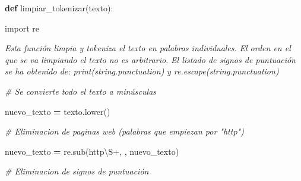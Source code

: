 \documentclass[
  11pt,
  a4paper,
]{article}
\newenvironment{Shaded}{\begin{snugshade}}{\end{snugshade}}
\newcommand{\CommentTok}[1]{\textcolor[rgb]{0.56,0.35,0.01}{\textit{#1}}}
\newcommand{\ImportTok}[1]{#1}
\newcommand{\KeywordTok}[1]{\textcolor[rgb]{0.13,0.29,0.53}{\textbf{#1}}}
\newcommand{\NormalTok}[1]{#1}
\newcommand{\OperatorTok}[1]{\textcolor[rgb]{0.81,0.36,0.00}{\textbf{#1}}}
\newcommand{\StringTok}[1]{\textcolor[rgb]{0.31,0.60,0.02}{#1}}
\begin{document}
\begin{Shaded}
\begin{Highlighting}[]
\KeywordTok{def}\NormalTok{ limpiar\_tokenizar(texto):}

    \ImportTok{import}\NormalTok{ re}
    
    \CommentTok{\textquotesingle{}\textquotesingle{}\textquotesingle{}}
\CommentTok{    Esta función limpia y tokeniza el texto en palabras individuales.}
\CommentTok{    El orden en el que se va limpiando el texto no es arbitrario.}
\CommentTok{    El listado de signos de puntuación se ha obtenido de: print(string.punctuation)}
\CommentTok{    y re.escape(string.punctuation)}
\CommentTok{    \textquotesingle{}\textquotesingle{}\textquotesingle{}}
    
    \CommentTok{\# Se convierte todo el texto a minúsculas}

\NormalTok{    nuevo\_texto }\OperatorTok{=}\NormalTok{ texto.lower()}
    
    \CommentTok{\# Eliminacion de paginas web (palabras que empiezan por "http")}
    
\NormalTok{    nuevo\_texto }\OperatorTok{=}\NormalTok{ re.sub(}\StringTok{\textquotesingle{}http\textbackslash{}S+\textquotesingle{}}\NormalTok{, }\StringTok{\textquotesingle{} \textquotesingle{}}\NormalTok{, nuevo\_texto)}
    
    \CommentTok{\# Eliminacion de signos de puntuación}
    

\end{Highlighting}
\end{Shaded}
\end{document}
